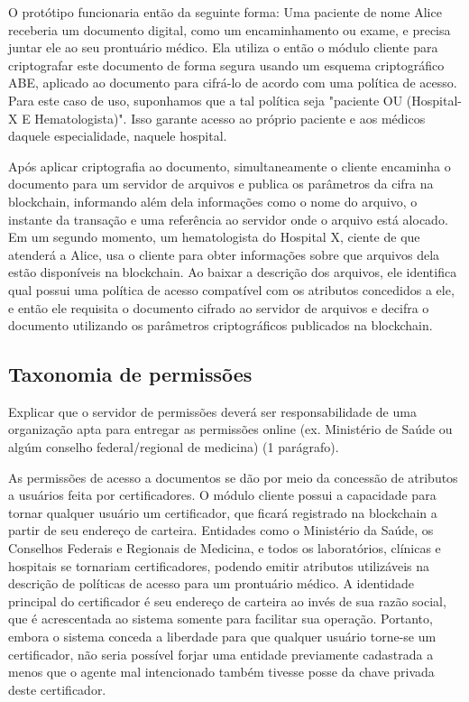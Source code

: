 \documentclass[a4paper,11pt]{article}
\begin{document}
O protótipo funcionaria então da seguinte forma: Uma paciente de nome Alice receberia um documento digital, como um encaminhamento ou exame, e precisa juntar ele ao seu prontuário médico. Ela utiliza o então o módulo cliente para criptografar este documento de forma segura usando um esquema criptográfico ABE, aplicado ao documento para cifrá-lo de acordo com uma política de acesso. Para este caso de uso, suponhamos que a tal política seja "paciente OU (Hospital-X E Hematologista)". Isso garante acesso ao próprio paciente e aos médicos daquele especialidade, naquele hospital.

Após aplicar criptografia ao documento, simultaneamente o cliente encaminha o documento para um servidor de arquivos e publica os parâmetros da cifra na blockchain, informando além dela informações como o nome do arquivo, o instante da transação e uma referência ao servidor onde o arquivo está alocado. Em um segundo momento, um hematologista do Hospital X, ciente de que atenderá a Alice, usa o cliente para obter informações sobre que arquivos dela estão disponíveis na blockchain. Ao baixar a descrição dos arquivos, ele identifica qual possui uma política de acesso compatível com os atributos concedidos a ele, e então ele requisita o documento cifrado ao servidor de arquivos e decifra o documento utilizando os parâmetros criptográficos publicados na blockchain.

\subsection{Taxonomia de permissões}

{\color{ForestGreen}Explicar que o servidor de permissões deverá ser responsabilidade de uma organização apta para entregar as permissões online (ex. Ministério de Saúde ou algúm conselho federal/regional de medicina) (1 parágrafo)}.

As permissões de acesso a documentos se dão por meio da concessão de atributos a usuários feita por certificadores. O módulo cliente possui a capacidade para tornar qualquer usuário um certificador, que ficará registrado na blockchain a partir de seu endereço de carteira. Entidades como o Ministério da Saúde, os Conselhos Federais e Regionais de Medicina, e todos os laboratórios, clínicas e hospitais se tornariam certificadores, podendo emitir atributos utilizáveis na descrição de políticas de acesso para um prontuário médico. A identidade principal do certificador é seu endereço de carteira ao invés de sua razão social, que é acrescentada ao sistema somente para facilitar sua operação. Portanto, embora o sistema conceda a liberdade para que qualquer usuário torne-se um certificador, não seria possível forjar uma entidade previamente cadastrada a menos que o agente mal intencionado também tivesse posse da chave privada deste certificador.
\end{document}
